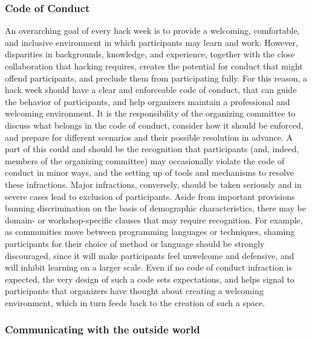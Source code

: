 \documentclass{aastex62}
\begin{document}
\clearpage
\subsubsection{Code of Conduct}

An overarching goal of every hack week is to provide a welcoming, comfortable, and inclusive environment in which participants may learn and work.
However, disparities in backgrounds, knowledge, and experience, together with the close collaboration that hacking requires, creates the potential for conduct that might offend participants, and preclude them from participating fully.
For this reason, a hack week should have a clear and enforceable code of conduct, that can guide the behavior of participants, and help organizers maintain a professional and welcoming environment.
It is the responsibility of the organizing committee to discuss what belongs in the code of conduct, consider how it should be enforced, and prepare for different scenarios and their possible resolution in advance.
A part of this could and should be the recognition that participants (and, indeed, members of the organizing committee) may occasionally violate the code of conduct in minor ways, and the setting up of tools and mechanisms to resolve these infractions. Major infractions, conversely, should be taken seriously and in severe cases lead to exclusion of participants.
Aside from important provisions banning discrimination on the basis of demographic characteristics, there may be domain- or workshop-specific clauses that may require recognition. For example, as communities move between programming languages or techniques, shaming participants for their choice of method or language should be strongly discouraged, since it will make participants feel unwelcome and defensive, and will inhibit learning on a larger scale.
Even if no code of conduct infraction is expected, the very design of such a code sets expectations, and helps signal to participants that organizers have thought about creating a welcoming environment, which in turn feeds back to the creation of such a space.

\subsubsection{Communicating with the outside world}
\end{document}
